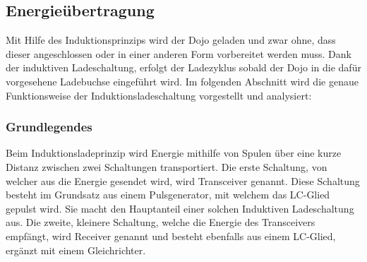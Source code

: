 \subsection{Energieübertragung}\label{sec:energieuebertragung}
Mit Hilfe des Induktionsprinzips wird der Dojo geladen und zwar ohne, dass dieser angeschlossen oder in einer anderen Form vorbereitet werden muss. Dank der induktiven Ladeschaltung, erfolgt der Ladezyklus sobald der Dojo in die dafür vorgesehene Ladebuchse eingeführt wird. Im folgenden Abschnitt wird die genaue Funktionsweise der Induktionsladeschaltung vorgestellt und analysiert:

\subsubsection*{Grundlegendes}
Beim Induktionsladeprinzip wird Energie mithilfe von Spulen über eine kurze Distanz zwischen zwei Schaltungen transportiert. Die erste Schaltung, von welcher aus die Energie gesendet wird, wird Transceiver genannt. Diese Schaltung besteht im Grundsatz aus einem Pulsgenerator, mit welchem das LC-Glied gepulst wird. Sie macht den Hauptanteil einer solchen Induktiven Ladeschaltung aus. Die zweite, kleinere Schaltung, welche die Energie des Transceivers empfängt, wird Receiver genannt und besteht ebenfalls aus einem LC-Glied, ergänzt mit einem Gleichrichter.

